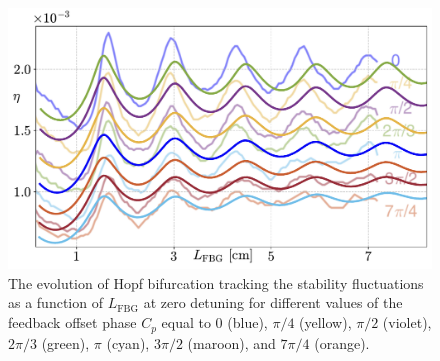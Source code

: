 %
\begin{figure}[!t]
    \centering   
    \includegraphics[width=0.75\linewidth]{Images/Chapter 2/discretised_Skenderas_wzeta_Cpcomparison_N20.pdf}    
    \caption{The evolution of Hopf bifurcation tracking the stability fluctuations as a function of $L_\text{FBG}$ at zero detuning for different values of the feedback offset phase $C_p$ equal to $0$ (blue), $\pi /4$ (yellow), $\pi/2$ (violet), $2\pi/3$ (green), $\pi$ (cyan), $3\pi/2$ (maroon), and $7\pi/4$ (orange).}
    \label{fig:Skenderas_Hopf_Cpvars}
\end{figure}
%
